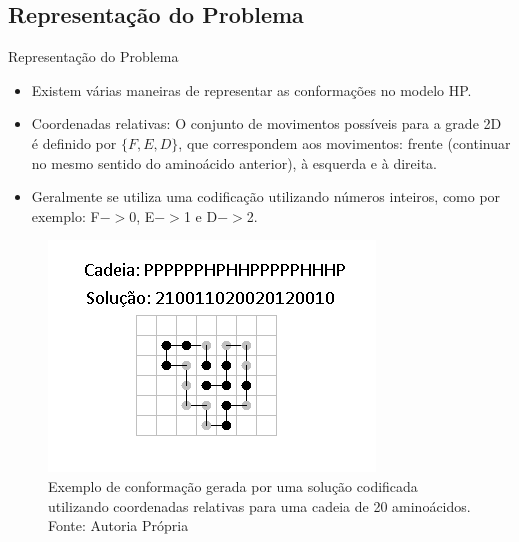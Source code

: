 \subsection{Representação do Problema}
\begin{frame}[allowframebreaks]{Representação do Problema}
	
	\begin{itemize}
		\item Existem várias maneiras de representar as conformações no modelo HP.
		\item 	Coordenadas relativas: O conjunto de movimentos possíveis para a grade 2D é definido por $\{F,E,D\}$, que correspondem aos movimentos: frente (continuar no mesmo sentido do aminoácido anterior), à esquerda e à direita. 
		\item Geralmente se utiliza uma codificação utilizando números inteiros, como por exemplo:  F$->$0, E$->$1 e D$->$2. 
	\end{itemize}
	
	\begin{figure}[!htb]
		\centering
		\includegraphics[scale=.8]{figuras/ExemploCodificacao.png}
		\caption{Exemplo de conformação gerada por uma solução codificada utilizando coordenadas relativas para uma cadeia de 20 aminoácidos.  Fonte: Autoria Própria }
		\label{fig:exemploCodificacao}
	\end{figure}



	
\end{frame}

	
